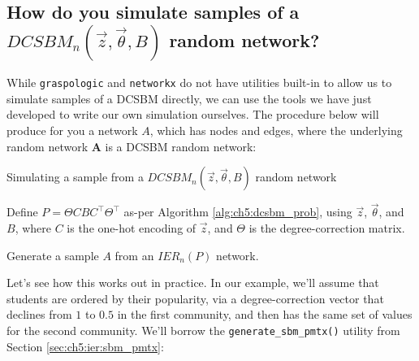 \begin{floatingbox}[h]\caption{}
    
\end{floatingbox}

\subsection{How do you simulate samples of a $DCSBM_n(\vec z, \vec \theta, B)$ random network?}

While \texttt{graspologic} and \texttt{networkx} do not have utilities built-in to allow us to simulate samples of a DCSBM directly, we can use the tools we have just developed to write our own simulation ourselves. The procedure below will produce for you a network $A$, which has nodes and edges, where the underlying random network $\mathbf A$ is a DCSBM random network:

\begin{algorithm}[h]\caption{Simulating a sample from a $DCSBM_n(\vec z, \vec \theta, B)$ random network}
\label{alg:ch5:sbm}
\SetAlgoLined
{}

Define $P = \Theta CBC^\top \Theta^\top$ as-per Algorithm \ref{alg:ch5:dcsbm_prob}, using $\vec z$, $\vec \theta$, and $B$, where $C$ is the one-hot encoding of $\vec z$, and $\Theta$ is the degree-correction matrix.

Generate a sample $A$ from an $IER_n(P)$ network.

\end{algorithm}

Let's see how this works out in practice. In our example, we'll assume that students are ordered by their popularity, via a degree-correction vector that declines from $1$ to $0.5$ in the first community, and then has the same set of values for the second community. We'll borrow the \texttt{generate\_sbm\_pmtx()} utility from Section \ref{sec:ch5:ier:sbm_pmtx}:

